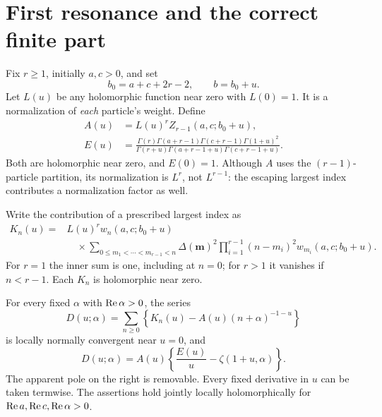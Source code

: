\section{First resonance and the correct finite part}
\label{dhr:sec:resonance}

Fix $r\geq1$, initially $a,c>0$, and set
\begin{equation}\label{dhr:eq:resonant-parameters}
 b_0=a+c+2r-2,\qquad b=b_0+u.
\end{equation}
Let $L(u)$ be any holomorphic function near zero with $L(0)=1$.
It is a normalization of \emph{each} particle's weight. Define
\begin{equation}\label{dhr:eq:amplitude-E}
 \begin{split}
 A(u)&=L(u)^r Z_{r-1}(a,c;b_0+u),\\
 E(u)&=\frac{\Gamma(r)\Gamma(a+r-1)\Gamma(c+r-1)\Gamma(1+u)^2}
 {\Gamma(r+u)\Gamma(a+r-1+u)\Gamma(c+r-1+u)}.
 \end{split}
\end{equation}
Both are holomorphic near zero, and $E(0)=1$. Although $A$ uses the
$(r-1)$-particle partition, its normalization is $L^r$, not $L^{r-1}$:
the escaping largest index contributes a normalization factor as well.

Write the contribution of a prescribed largest index as
\begin{equation}\label{dhr:eq:maximum-mass}
 \begin{split}
 K_n(u)={}&L(u)^r w_n(a,c;b_0+u)\\
 &\quad\times\sum_{0\leq m_1<\cdots<m_{r-1}<n}
 \Delta(\bm m)^2\prod_{i=1}^{r-1}
       (n-m_i)^2w_{m_i}(a,c;b_0+u).
 \end{split}
\end{equation}
For $r=1$ the inner sum is one, including at $n=0$; for $r>1$ it
vanishes if $n<r-1$. Each $K_n$ is holomorphic near zero.

\begin{theorem}\label{dhr:thm:resonance}
For every fixed $\alpha$ with $\operatorname{Re}\alpha>0$, the series
\begin{equation}\label{dhr:eq:D-def}
 D(u;\alpha)=\sum_{n\geq0}
 \left\{K_n(u)-A(u)(n+\alpha)^{-1-u}\right\}
\end{equation}
is locally normally convergent near $u=0$, and
\begin{equation}\label{dhr:eq:D-master}
 \boxed{D(u;\alpha)=A(u)
       \left\{\frac{E(u)}u-\zeta(1+u,\alpha)\right\}.}
\end{equation}
The apparent pole on the right is removable. Every fixed derivative
in $u$ can be taken termwise. The assertions hold jointly locally
holomorphically for $\operatorname{Re} a,\operatorname{Re} c,\operatorname{Re}\alpha>0$.
\end{theorem}

